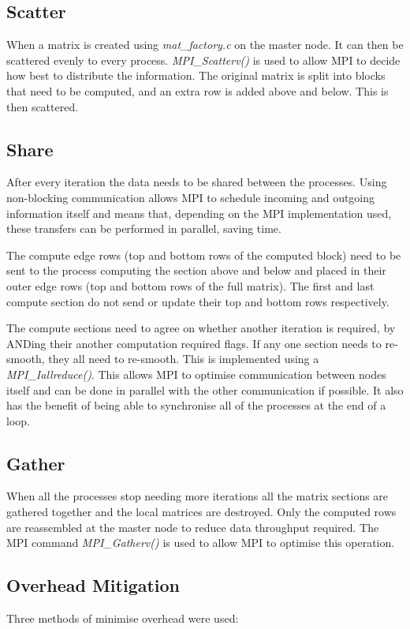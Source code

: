\documentclass[a4paper,10pt]{report}
\begin{document}
\subsection{Scatter}
When a matrix is created using \emph{mat\_factory.c} on the master node. It can then be scattered evenly to every process. \emph{MPI\_Scatterv()} is used to allow MPI to decide how best to distribute the information. The original matrix is split into blocks that need to be computed, and an extra row is added above and below. This is then scattered.
\subsection{Share}
After every iteration the data needs to be shared between the processes. Using non-blocking communication allows MPI to schedule incoming and outgoing information itself and means that, depending on the MPI implementation used, these transfers can be performed in parallel, saving time.

The compute edge rows (top and bottom rows of the computed block) need to be sent to the process computing the section above and below and placed in their outer edge rows (top and bottom rows of the full matrix). The first and last compute section do not send or update their top and bottom rows respectively.

The compute sections need to agree on whether another iteration is required, by ANDing their another computation required flags. If any one section needs to re-smooth, they all need to re-smooth. This is implemented using a \emph{MPI\_Iallreduce()}. This allows MPI to optimise communication between nodes itself and can be done in parallel with the other communication if possible. It also has the benefit of being able to synchronise all of the processes at the end of a loop.
\subsection{Gather}
When all the processes stop needing more iterations all the matrix sections are gathered together and the local matrices are destroyed. Only the computed rows are reassembled at the master node to reduce data throughput required. The MPI command \emph{MPI\_Gatherv()} is used to allow MPI to optimise this operation.
\subsection{Overhead Mitigation}
Three methods of minimise overhead were used:
\end{document}
